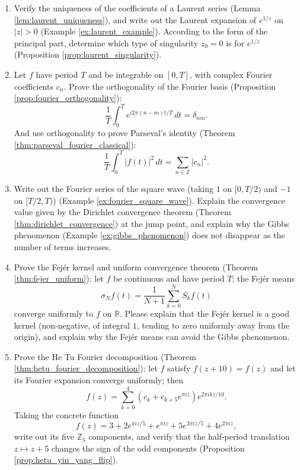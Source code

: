 \begin{enumerate}[leftmargin=3em, label=\textbf{Exercise \arabic*}]
    \item Verify the uniqueness of the coefficients of a Laurent series (Lemma \ref{lem:laurent_uniqueness}),
    and write out the Laurent expansion of $e^{1/z}$ on $|z|>0$ (Example \ref{ex:laurent_example}).
    According to the form of the principal part, determine which type of singularity $z_0=0$ is for $e^{1/z}$
    (Proposition \ref{prop:laurent_singularity}).

    \item Let $f$ have period $T$ and be integrable on $[0,T]$, with complex Fourier coefficients $c_n$.
    Prove the orthogonality of the Fourier basis (Proposition \ref{prop:fourier_orthogonality}):
    \[
    \frac{1}{T}\int_0^T e^{i2\pi(n-m)t/T}\,dt=\delta_{nm}.
    \]
    And use orthogonality to prove Parseval's identity (Theorem \ref{thm:parseval_fourier_classical}):
    \[
    \frac{1}{T}\int_0^T|f(t)|^2\,dt=\sum_{n\in\mathbb{Z}}|c_n|^2.
    \]

    \item Write out the Fourier series of the square wave (taking $1$ on $[0,T/2)$ and $-1$ on $[T/2,T)$)
    (Example \ref{ex:fourier_square_wave}).
    Explain the convergence value given by the Dirichlet convergence theorem (Theorem \ref{thm:dirichlet_convergence}) at the jump point,
    and explain why the Gibbs phenomenon (Example \ref{ex:gibbs_phenomenon}) does not disappear as the number of terms increases.

    \item Prove the Fej\'er kernel and uniform convergence theorem (Theorem \ref{thm:fejer_uniform}):
    let $f$ be continuous and have period $T$; the Fej\'er means
    \[
    \sigma_Nf(t)=\frac{1}{N+1}\sum_{k=0}^{N}S_kf(t)
    \]
    converge uniformly to $f$ on $\mathbb{R}$.
    Please explain that the Fej\'er kernel is a good kernel (non-negative, of integral $1$, tending to zero uniformly away from the origin),
    and explain why the Fej\'er means can avoid the Gibbs phenomenon.

    \item Prove the He Tu Fourier decomposition (Theorem \ref{thm:hetu_fourier_decomposition}):
    let $f$ satisfy $f(z+10)=f(z)$ and let its Fourier expansion converge uniformly; then
    \[
    f(z)=\sum_{k=0}^{4}\left(c_k+c_{k+5}e^{\pi iz}\right)e^{2\pi ikz/10}.
    \]
    Taking the concrete function
    \[
    f(z)=3+2e^{\pi iz/5}+e^{\pi iz}+5e^{3\pi iz/5}+4e^{2\pi iz},
    \]
    write out its five $\mathbb{Z}_5$ components, and verify that the half-period translation $z\mapsto z+5$ changes the sign of the odd components
    (Proposition \ref{prop:hetu_yin_yang_flip}).


\end{enumerate}
